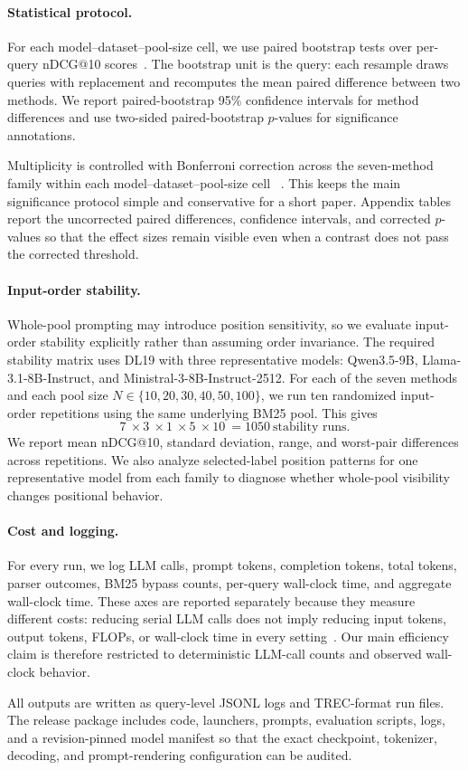 \paragraph{Statistical protocol.}
For each model--dataset--pool-size cell, we use paired bootstrap tests
over per-query nDCG@10 scores~\citep{efron1993bootstrap,
smucker2007comparison,urbano2019significance}. The bootstrap unit is the
query: each resample draws queries with replacement and recomputes the
mean paired difference between two methods. We report paired-bootstrap
95\% confidence intervals for method differences and use two-sided
paired-bootstrap $p$-values for significance annotations.

Multiplicity is controlled with Bonferroni correction across the
seven-method family within each model--dataset--pool-size cell
~\citep{bonferroni1936teoria}. This keeps the main significance protocol
simple and conservative for a short paper. Appendix tables report the
uncorrected paired differences, confidence intervals, and corrected
$p$-values so that the effect sizes remain visible even when a contrast
does not pass the corrected threshold.

\paragraph{Input-order stability.}
Whole-pool prompting may introduce position sensitivity, so we evaluate
input-order stability explicitly rather than assuming order invariance.
The required stability matrix uses DL19 with three representative models:
Qwen3.5-9B, Llama-3.1-8B-Instruct, and
Ministral-3-8B-Instruct-2512. For each of the seven methods and each
pool size $N \in \{10,20,30,40,50,100\}$, we run ten randomized input-order
repetitions using the same underlying BM25 pool. This gives
\[
7\
\times 3\
\times 1\
\times 5\
\times 10\
= 1050\ \text{stability runs}.
\]
We report mean nDCG@10, standard deviation, range, and worst-pair
differences across repetitions. We also analyze selected-label position
patterns for one representative model from each family to diagnose
whether whole-pool visibility changes positional behavior.

\paragraph{Cost and logging.}
For every run, we log LLM calls, prompt tokens, completion tokens, total
tokens, parser outcomes, BM25 bypass counts, per-query wall-clock time,
and aggregate wall-clock time. These axes are reported separately because
they measure different costs: reducing serial LLM calls does not imply
reducing input tokens, output tokens, FLOPs, or wall-clock time in every
setting~\citep{peng2025flopsreranking}. Our main efficiency claim is
therefore restricted to deterministic LLM-call counts and observed
wall-clock behavior.

All outputs are written as query-level JSONL logs and TREC-format run
files. The release package includes code, launchers, prompts, evaluation
scripts, logs, and a revision-pinned model manifest so that the exact
checkpoint, tokenizer, decoding, and prompt-rendering configuration can
be audited.